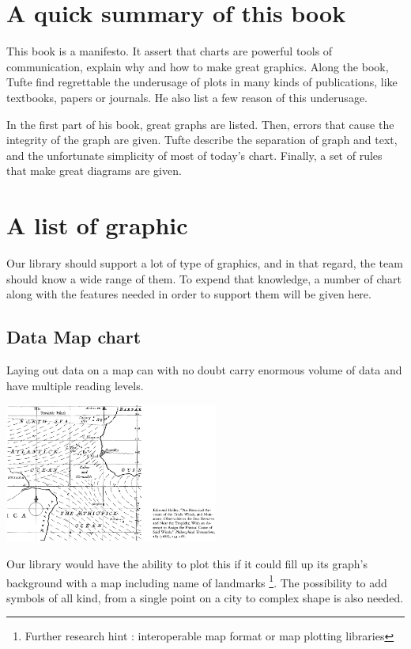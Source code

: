 \section{A quick summary of this book}
This book is a manifesto. It assert that charts are powerful tools of communication, explain why and how to make great graphics.
Along the book, Tufte find regrettable the underusage of plots in many kinds of publications, like textbooks, papers or journals. He also list a few reason of this underusage.

In the first part of his book, great graphs are listed. Then, errors that cause the integrity of the graph are given. Tufte describe the separation of graph and text, and the unfortunate simplicity of most of today's chart.
Finally, a set of rules that make great diagrams are given.




\section{A list of graphic}
Our library should support a lot of type of graphics, and in that regard, the team should know a wide range of them. To expend that knowledge, a number of chart along with the features needed in order to support them will be given here.

\subsection{Data Map chart}
Laying out data on a map can with no doubt carry enormous volume of data and have multiple reading levels.

\centerline{
\includegraphics[width=07cm]{./illustrations/annexes/carte_courants.eps}
}
Our library would have the ability to plot this if it could fill up its graph's background with a map
 including name of landmarks
\footnote{Further research hint : interoperable map format or map plotting libraries}.
 The possibility to add symbols of all kind, from a single point on a city to complex shape is also needed. 

